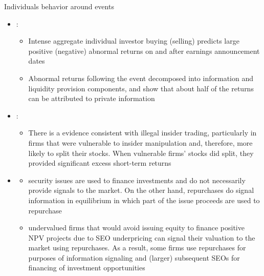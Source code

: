 \documentclass{beamer}
\begin{document}
	
	\begin{frame}{Individuals behavior around events}
		\begin{itemize}\scriptsize
			\item 	\cite{kaniel2012individual} :
			\begin{itemize}\tiny
				\item Intense
				aggregate individual investor buying (selling) predicts large positive (negative) abnormal returns on and after earnings announcement dates
				\item 
				Abnormal returns following the event decomposed  into information and liquidity provision components, and show that about half of the returns can be attributed to private information
			\end{itemize} 
			\item \cite{nguyen2017stock}:
			\begin{itemize}\tiny
				\item There is a evidence consistent with illegal insider trading,
				particularly in firms that were vulnerable to insider manipulation and, therefore, more likely to split
				their stocks. When vulnerable firms’ stocks did split, they provided significant excess short-term
				returns
				
				
				
			\end{itemize}
			\item 
			\begin{itemize}\tiny
				\item  \cite{constantinides1989optimal}
				security issues are used to finance investments and do not necessarily provide signals to the
				market. On the other hand, repurchases do signal information in equilibrium in which part of the
				issue proceeds are used to repurchase
				\item \cite{bond2016buying} undervalued firms that
				would avoid issuing equity to finance positive NPV projects due to SEO underpricing can signal
				their valuation to the market using repurchases. As a result, some firms use repurchases for
				purposes of information signaling and (larger) subsequent SEOs for financing of investment opportunities
			\end{itemize}
		\end{itemize}
	\end{frame}
	
	
	
\end{document}
